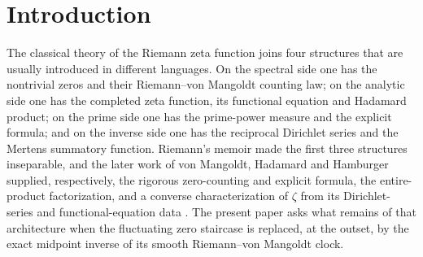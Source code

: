 %

\section{Introduction}
\label{sec:introduction}

The classical theory of the Riemann zeta function joins four structures that
are usually introduced in different languages.  On the spectral side one has
the nontrivial zeros and their Riemann--von Mangoldt counting law; on the
analytic side one has the completed zeta function, its functional equation and
Hadamard product; on the prime side one has the prime-power measure and the
explicit formula; and on the inverse side one has the reciprocal Dirichlet
series and the Mertens summatory function.  Riemann's memoir made the first
three structures inseparable, and the later work of von Mangoldt, Hadamard and
Hamburger supplied, respectively, the rigorous zero-counting and explicit
formula, the entire-product factorization, and a converse characterization of
$\zeta$ from its Dirichlet-series and functional-equation data
\cite{Riemann1859,vonMangoldt1895,Hadamard1896,Hamburger1921,Titchmarsh1986,Edwards1974}.
The present paper asks what remains of that architecture when the fluctuating
zero staircase is replaced, at the outset, by the exact midpoint inverse of
its smooth Riemann--von Mangoldt clock.

